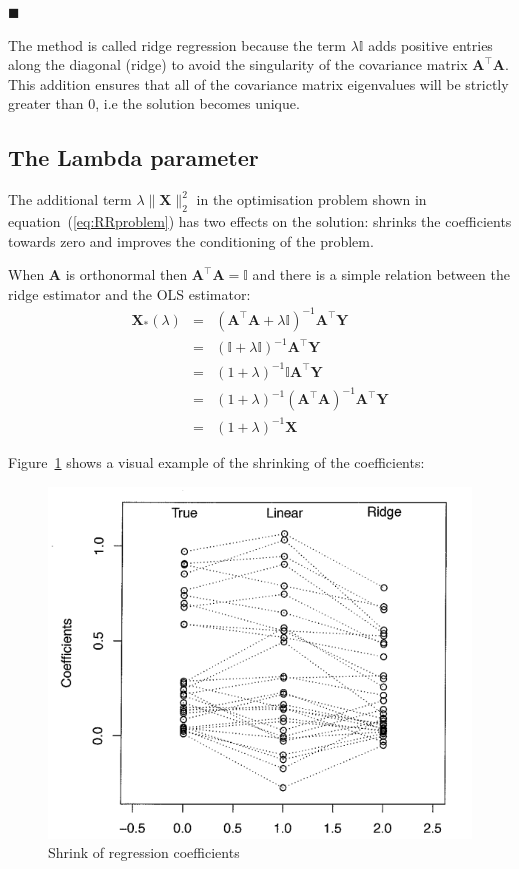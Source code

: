 $\blacksquare$


The method is called ridge regression because the term $\lambda \mathbb{I}$ adds positive entries along the diagonal (ridge) to avoid the
singularity of the covariance matrix $\mathbf{A}^\top \mathbf{A}$. This addition ensures that all of the covariance matrix eigenvalues will be strictly greater than 0, i.e the solution becomes unique.


\subsection{The Lambda parameter}

The additional term $\lambda \|\mathbf{\mathbf{X}}\|_2^2$ in the optimisation
problem shown in equation~(\ref{eq:RRproblem}) has two effects on the solution:
shrinks the coefficients towards zero and improves the conditioning of the
problem.

When $\mathbf{A}$ is orthonormal then $\mathbf{A}^\top \mathbf{A} =\mathbb{I}$ and there is a simple relation between the ridge estimator and the OLS estimator:
\begin{eqnarray*}
\mathbf{X}_* (\lambda) &=& (\mathbf{A}^\top \mathbf{A}+\lambda \mathbb{I})^{-1}\mathbf{A}^\top \mathbf{Y} \\
 &=& (\mathbb{I} + \lambda \mathbb{I})^{-1} \mathbf{A}^\top \mathbf{Y} \\
 &=&(1+\lambda)^{-1} \mathbb{I} \mathbf{A}^\top \mathbf{Y} \\
 &=&(1+\lambda)^{-1} (\mathbf{A}^\top \mathbf{A})^{-1}\mathbf{A}^\top \mathbf{Y} \\
 &=&(1+\lambda)^{-1} \mathbf{X}
\end{eqnarray*}

Figure~\ref{fig:shrinks} shows a visual example of the shrinking of the
coefficients:

\begin{figure}[h!]
\includegraphics[width=0.5\linewidth]{img/shrinks}
\caption{Shrink of regression coefficients}
\label{fig:shrinks}
\end{figure}




